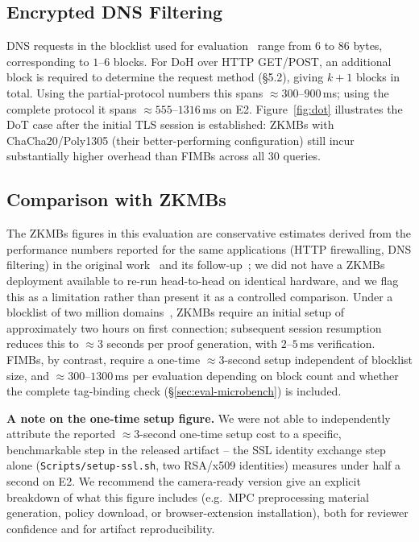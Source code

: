 \subsection{Encrypted DNS Filtering}
\label{sec:eval-dns}

DNS requests in the blocklist used for evaluation~\cite{blocklist}
range from $6$ to $86$ bytes, corresponding to $1$--$6$ blocks. For
DoH over HTTP GET/POST, an additional block is required to determine
the request method (\S5.2), giving $k+1$ blocks in total. Using the
partial-protocol numbers this spans $\approx 300$--$900$\,ms; using
the complete protocol it spans $\approx 555$--$1316$\,ms on E2.
Figure~\ref{fig:dot} illustrates the DoT case after the initial TLS
session is established: ZKMBs with ChaCha20/Poly1305 (their
better-performing configuration) still incur substantially higher
overhead than FIMBs across all $30$ queries.

\subsection{Comparison with ZKMBs}
\label{sec:eval-zkmb}

The ZKMBs figures in this evaluation are conservative estimates
derived from the performance numbers reported for the same
applications (HTTP firewalling, DNS filtering) in the original
work~\cite{Grubbs2022ZKMB} and its follow-up~\cite{Zhang2024Zombie}; we
did not have a ZKMBs deployment available to re-run head-to-head on
identical hardware, and we flag this as a limitation rather than
present it as a controlled comparison. Under a blocklist of two
million domains~\cite{blocklist}, ZKMBs require an initial setup of
approximately two hours on first connection; subsequent session
resumption reduces this to $\approx 3$ seconds per proof generation,
with $2$--$5$\,ms verification. FIMBs, by contrast, require a
one-time $\approx 3$-second setup independent of blocklist size, and
$\approx 300$--$1300$\,ms per evaluation depending on block count and
whether the complete tag-binding check (\S\ref{sec:eval-microbench})
is included.

\textbf{A note on the one-time setup figure.} We were not able to
independently attribute the reported $\approx 3$-second one-time setup
cost to a specific, benchmarkable step in the released artifact --
the SSL identity exchange step alone (\texttt{Scripts/setup-ssl.sh},
two RSA/x509 identities) measures under half a second on E2. We
recommend the camera-ready version give an explicit breakdown of what
this figure includes (e.g.\ MPC preprocessing material generation,
policy download, or browser-extension installation), both for
reviewer confidence and for artifact reproducibility.

